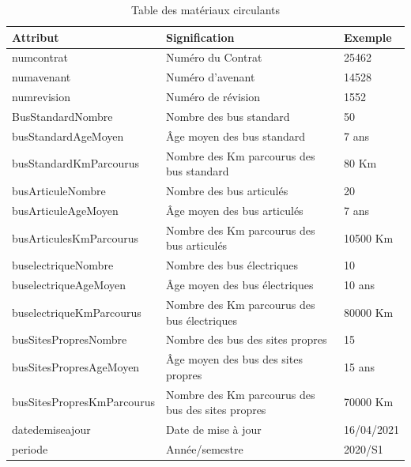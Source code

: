 \documentclass[a4paper]{report}
\begin{document}
\begin{doublespace}
	\begin{table}[H]
		\begin{center}
			\begin{tabularx}{17.5cm}{|p{6cm}|X|p{2.5cm}|}
				\hline
				\textbf{Attribut}          & \textbf{Signification}                            & \textbf{Exemple} \\
				\hline
				numcontrat                 & Numéro du Contrat                                 & 25462            \\
				\hline
				numavenant                 & Numéro d'avenant                                  & 14528            \\
				\hline
				numrevision                & Numéro de révision                                & 1552             \\
				\hline
				BusStandardNombre          & Nombre des bus standard                           & 50               \\
				\hline
				busStandardAgeMoyen        & Âge moyen des bus standard                        & 7 ans            \\
				\hline
				busStandardKmParcourus     & Nombre des Km parcourus des bus standard          & 80 Km            \\
				\hline
				busArticuleNombre          & Nombre des bus articulés                          & 20               \\
				\hline
				busArticuleAgeMoyen        & Âge moyen des bus articulés                       & 7 ans            \\
				\hline
				busArticulesKmParcourus    & Nombre des Km parcourus des bus articulés         & 10500 Km         \\
				\hline
				buselectriqueNombre        & Nombre des bus électriques                        & 10               \\
				\hline
				buselectriqueAgeMoyen      & Âge moyen des bus électriques                     & 10 ans           \\
				\hline
				buselectriqueKmParcourus   & Nombre des Km parcourus des bus électriques       & 80000 Km         \\
				\hline
				busSitesPropresNombre      & Nombre des bus des sites propres                  & 15               \\
				\hline
				busSitesPropresAgeMoyen    & Âge moyen des bus des sites propres               & 15 ans           \\
				\hline
				busSitesPropresKmParcourus & Nombre des Km parcourus des bus des sites propres & 70000 Km         \\
				\hline
				datedemiseajour            & Date de mise à jour                               & 16/04/2021       \\
				\hline
				periode                    & Année/semestre                                    & 2020/S1          \\
				\hline
			\end{tabularx}
			\caption{Table des matériaux circulants}
		\end{center}
	\end{table}


\end{doublespace}
\end{document}
